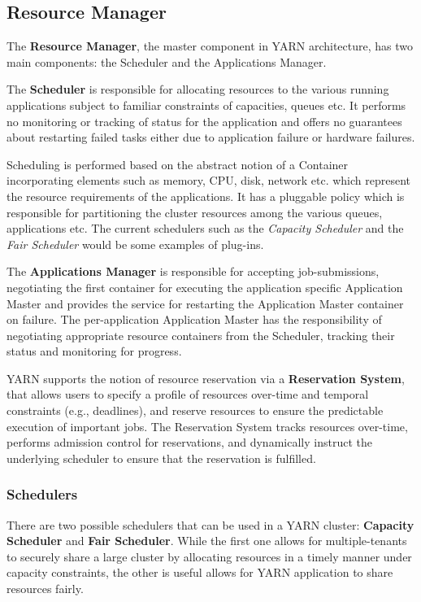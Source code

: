 \subsection{Resource Manager}

The \textbf{Resource Manager}, the master component in YARN architecture, has two main components: the Scheduler and the Applications Manager.

The \textbf{Scheduler} is responsible for allocating resources to the various running applications subject to familiar constraints of capacities, queues etc. It performs no monitoring or tracking of status for the application and offers no guarantees about restarting failed tasks either due to application failure or hardware failures. 

Scheduling is performed based on the abstract notion of a Container incorporating elements such as memory, CPU, disk, network etc. which represent the resource requirements of the applications. It has a pluggable policy which is responsible for partitioning the cluster resources among the various queues, applications etc. The current schedulers such as the \textit{Capacity Scheduler} and the \textit{Fair Scheduler} would be some examples of plug-ins.

The \textbf{Applications Manager} is responsible for accepting job-submissions, negotiating the first container for executing the application specific Application Master and provides the service for restarting the Application Master container on failure. The per-application Application Master has the responsibility of negotiating appropriate resource containers from the Scheduler, tracking their status and monitoring for progress.

YARN supports the notion of resource reservation via a \textbf{Reservation System}, that allows users to specify a profile of resources over-time and temporal constraints (e.g., deadlines), and reserve resources to ensure the predictable execution of important jobs. The Reservation System tracks resources over-time, performs admission control for reservations, and dynamically instruct the underlying scheduler to ensure that the reservation is fulfilled.

\subsubsection{Schedulers}

There are two possible schedulers that can be used in a YARN cluster: \textbf{Capacity Scheduler} and \textbf{Fair Scheduler}. While the first one allows for multiple-tenants to securely share a large cluster by allocating resources in a timely manner under capacity constraints, the other is useful allows for YARN application to share resources fairly.

